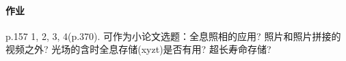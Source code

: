 \documentclass{ctexart}
\begin{document}


\paragraph{作业} %
\label{par:作业}

p.157 1, 2, 3, 4(p.370). 可作为小论文选题：全息照相的应用? 照片和照片拼接的视频之外? 
光场的含时全息存储(xyzt)是否有用? 超长寿命存储?


\end{document}
